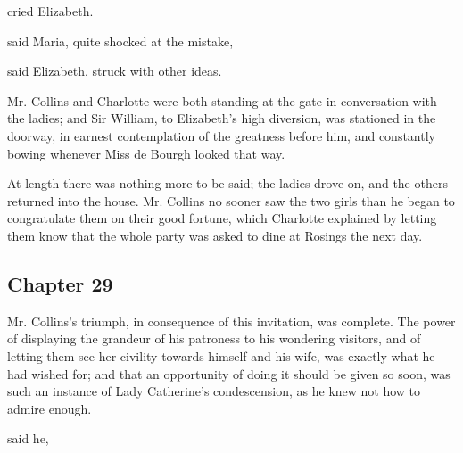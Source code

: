  cried Elizabeth. 

 said Maria, quite shocked at the mistake, 



 said Elizabeth, struck with other ideas. 

Mr. Collins and Charlotte were both standing at the gate in conversation with the ladies; and Sir William, to Elizabeth's high diversion, was stationed in the doorway, in earnest contemplation of the greatness before him, and constantly bowing whenever Miss de Bourgh looked that way.

At length there was nothing more to be said; the ladies drove on, and the others returned into the house. Mr. Collins no sooner saw the two girls than he began to congratulate them on their good fortune, which Charlotte explained by letting them know that the whole party was asked to dine at Rosings the next day.

\subsection[chapter-29]{\useURL[url29][][][]\from[url29] Chapter 29}

Mr. Collins's triumph, in consequence of this invitation, was complete. The power of displaying the grandeur of his patroness to his wondering visitors, and of letting them see her civility towards himself and his wife, was exactly what he had wished for; and that an opportunity of doing it should be given so soon, was such an instance of Lady Catherine's condescension, as he knew not how to admire enough.

 said he, 

